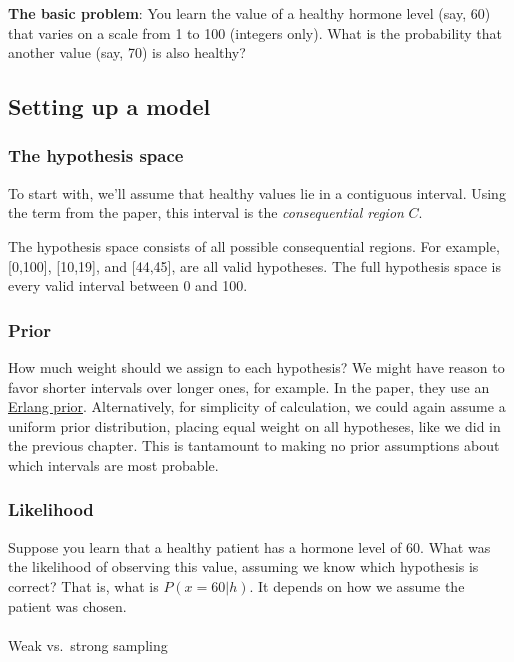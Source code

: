 \documentclass[
  letterpaper,
  DIV=11,
  numbers=noendperiod]{scrreprt}
\makeatletter
\let\oldparagraph\paragraph
\renewcommand{\paragraph}{
    \@ifstar
      \xxxParagraphStar
      \xxxParagraphNoStar
  }
\newcommand{\xxxParagraphStar}[1]{\oldparagraph*{#1}\mbox{}}
\newcommand{\xxxParagraphNoStar}[1]{\oldparagraph{#1}\mbox{}}
\makeatother
\begin{document}
\textbf{The basic problem}: You learn the value of a healthy hormone
level (say, 60) that varies on a scale from 1 to 100 (integers only).
What is the probability that another value (say, 70) is also healthy?

\subsection{Setting up a model}\label{setting-up-a-model}

\subsubsection{The hypothesis space}\label{the-hypothesis-space}

To start with, we'll assume that healthy values lie in a contiguous
interval. Using the term from the paper, this interval is the
\emph{consequential region} \(C\).

The hypothesis space consists of all possible consequential regions. For
example, {[}0,100{]}, {[}10,19{]}, and {[}44,45{]}, are all valid
hypotheses. The full hypothesis space is every valid interval between 0
and 100.

\subsubsection{Prior}\label{prior}

How much weight should we assign to each hypothesis? We might have
reason to favor shorter intervals over longer ones, for example. In the
paper, they use an
\href{https://en.wikipedia.org/wiki/Erlang_distribution}{Erlang prior}.
Alternatively, for simplicity of calculation, we could again assume a
uniform prior distribution, placing equal weight on all hypotheses, like
we did in the previous chapter. This is tantamount to making no prior
assumptions about which intervals are most probable.

\subsubsection{Likelihood}\label{likelihood}

Suppose you learn that a healthy patient has a hormone level of 60. What
was the likelihood of observing this value, assuming we know which
hypothesis is correct? That is, what is \(P(x = 60 | h)\). It depends on
how we assume the patient was chosen.

\paragraph{Weak vs.~strong sampling}\label{weak-strong-sampling}
\end{document}
